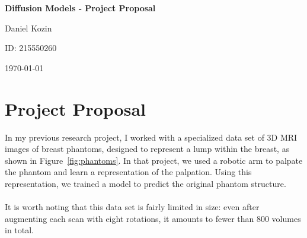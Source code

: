 \documentclass[11pt,a4paper]{article}
\begin{document}
\thispagestyle{empty}
\begin{titlepage}
    \centering
    \vspace*{3cm}
    
    {\Huge\bfseries Diffusion Models - Project Proposal \par}    
    \vspace{3cm}
    {\Large Daniel Kozin \par}
    \vspace{1em}
    {\Large ID: 215550260 \par}
    \vspace{3em}
    {\Large \today \par}
    \vfill
\end{titlepage}

\pagestyle{fancy}
\setcounter{page}{1} 

\section{Project Proposal}
In my previous research project, I worked with a specialized data set of 3D MRI images of breast phantoms, designed to represent a lump within the breast, as shown in Figure~\ref{fig:phantoms}. In that project, we used a robotic arm to palpate the phantom and learn a representation of the palpation. Using this representation, we trained a model to predict the original phantom structure.
\\\\
It is worth noting that this data set is fairly limited in size: even after augmenting each scan with eight rotations, it amounts to fewer than 800 volumes in total.
\end{document}
